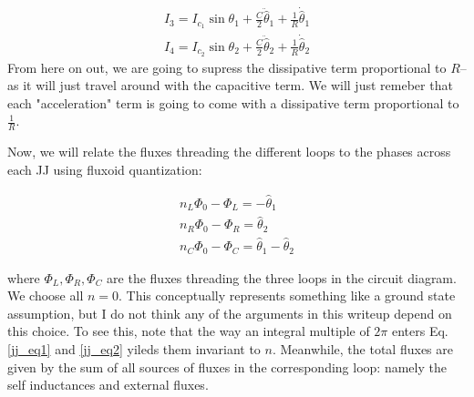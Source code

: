 \documentclass[paper=a4, twocolumn, fontsize=10pt]{article} %
\numberwithin{equation}{section} %
\numberwithin{figure}{section} %
\numberwithin{table}{section} %
\def \df#1{\hat{#1}}
\begin{document}
\begin{align}
    I_3 = I_{c_1} \sin \theta_1 + \frac{C}{2} \ddot{\df \theta}_1 + \frac{1}{R} \dot{ \df \theta }_1
    \\ 
    I_4 = I_{c_2} \sin \theta_2 + \frac{C}{2} \ddot{\df \theta}_2 + \frac{1}{R} \dot{ \df \theta}_2
    \end{align}
From here on out, we are going to supress the dissipative term proportional to $R$-- as it will just travel around with the capacitive term. We will just remeber that each "acceleration" term is going to come with a dissipative term proportional to $\frac{1}{R}$.

Now, we will relate the fluxes threading the different loops to the phases across each JJ using fluxoid quantization:

\begin{align}
     n_L\Phi_0 - \Phi_L = -\df\theta_1
    \\ 
    n_R \Phi_0 -  \Phi_R = \df\theta_2
    \\
    n_C \Phi_0 - \Phi_{C} = \df\theta_1  - \df\theta_2
\end{align}

where $\Phi_L, \Phi_R, \Phi_{C}$ are the fluxes threading the three loops in the circuit diagram. We choose all $n=0$. This conceptually represents something like a ground state assumption, but I do not think any of the arguments in this writeup depend on this choice. To see this, note that the way an integral multiple of $2\pi$ enters Eq. \ref{jj_eq1} and \ref{jj_eq2} yileds them invariant to $n$. Meanwhile, the total fluxes are given by the sum of all sources of fluxes in the corresponding loop: namely the self inductances and external fluxes.
\end{document}
